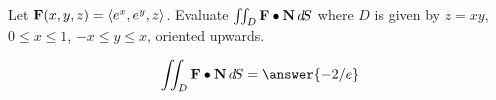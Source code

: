 \documentclass{ximera}
\author{David Guichard \and Neal Koblitz \and H. Jerome Keisler \and Albert Scheller \and Barry Balof \and Mike Wills \and Matthew Carr}
\begin{document}
\begin{exercise}




Let $\mathbf{F}(x,y,z)=\left\langle e^x,e^y,z\right\rangle$. Evaluate $\iint_{D}\mathbf{F}\bullet\mathbf{N}\mathop{}\!d\! S$ where $D$ is given by $z=xy$, $0\le x\le 1$, $-x\le y\le x$, oriented upwards.

\begin{prompt}
\[
\iint_{D}\vec{F}\dotp\vec{N}\d S=\answer{-2/e}
\]
\end{prompt}


\end{exercise}
\end{document}
